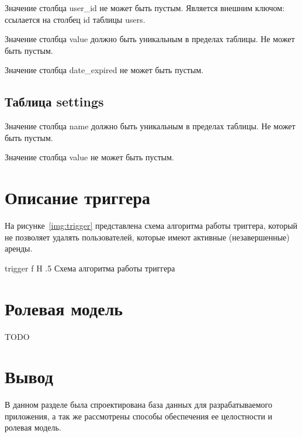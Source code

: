 Значение столбца user\_id не может быть пустым. Является внешним ключом: ссылается на столбец id таблицы users.

Значение столбца value должно быть уникальным в пределах таблицы. Не может быть пустым.

Значение столбца date\_expired не может быть пустым.

\subsection{Таблица settings}

Значение столбца name должно быть уникальным в пределах таблицы. Не может быть пустым.

Значение столбца value не может быть пустым.

\section{Описание триггера}

На рисунке~\ref{img:trigger} представлена схема алгоритма работы триггера, который не позволяет удалять пользователей, которые имеют активные (незавершенные) аренды.

    {trigger}
    {f}
    {H}
    {.5\textwidth}
    {Схема алгоритма работы триггера}

\section{Ролевая модель}

TODO

\section*{Вывод}

В данном разделе была спроектирована база данных для разрабатываемого приложения, а так же рассмотрены способы обеспечения ее целостности и ролевая модель.